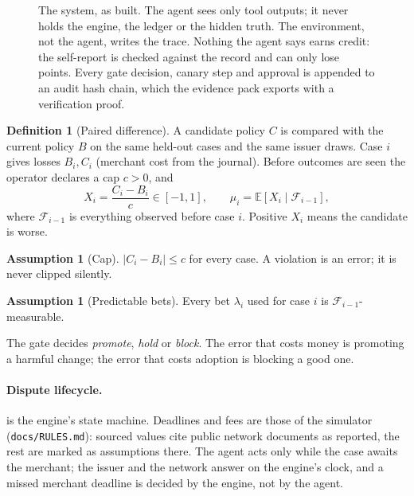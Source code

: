 \documentclass[11pt]{article}
\theoremstyle{definition}
\newtheorem{definition}[theorem]{Definition}
\newtheorem{assumption}[theorem]{Assumption}
\theoremstyle{remark}
\newcommand{\E}{\mathbb{E}}
\newcommand{\F}{\mathcal{F}}
\newcommand{\1}{\mathbf{1}}
\begin{document}
\begin{figure}[t]
\caption{The system, as built. The agent sees only tool outputs; it never holds the engine, the ledger or the hidden truth. The environment, not the agent, writes the trace. Nothing the agent says earns credit: the self-report is checked against the record and can only lose points. Every gate decision, canary step and approval is appended to an audit hash chain, which the evidence pack exports with a verification proof.}\label{fig:arch}
\end{figure}

\begin{definition}[Paired difference]
A candidate policy $C$ is compared with the current policy $B$ on the same held-out cases and the same issuer draws. Case $i$ gives losses $B_i, C_i$ (merchant cost from the journal). Before outcomes are seen the operator declares a cap $c>0$, and
\begin{equation}\label{eq:x}
X_i = \frac{C_i - B_i}{c} \in [-1,1], \qquad \mu_i = \E[X_i \mid \F_{i-1}],
\end{equation}
where $\F_{i-1}$ is everything observed before case $i$. Positive $X_i$ means the candidate is worse.
\end{definition}

\begin{assumption}[Cap]\label{ass:cap}
$|C_i - B_i|\le c$ for every case. A violation is an error; it is never clipped silently.
\end{assumption}

\begin{assumption}[Predictable bets]\label{ass:pred}
Every bet $\lambda_i$ used for case $i$ is $\F_{i-1}$-measurable.
\end{assumption}

The gate decides \emph{promote}, \emph{hold} or \emph{block}. The error that costs money is promoting a harmful change; the error that costs adoption is blocking a good one.

\paragraph{Dispute lifecycle.}  is the engine's state machine. Deadlines and fees are those of the simulator (\texttt{docs/RULES.md}): sourced values cite public network documents as reported, the rest are marked as assumptions there. The agent acts only while the case awaits the merchant; the issuer and the network answer on the engine's clock, and a missed merchant deadline is decided by the engine, not by the agent.
\end{document}
